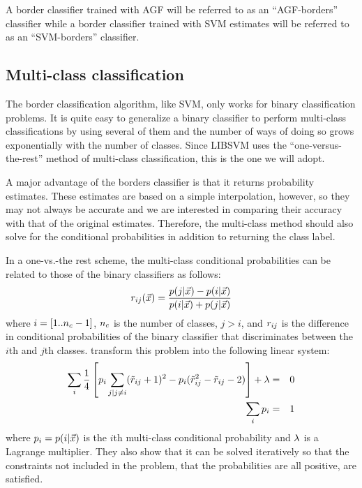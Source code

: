 \documentclass[11pt]{article}
\begin{document}
A border classifier trained with AGF will be referred to as an ``AGF-borders''
classifier while a border classifier trained with SVM estimates will
be referred to as an ``SVM-borders'' classifier.

\subsection{Multi-class classification}

The border classification algorithm, like SVM, only works for binary 
classification problems. It is quite easy to generalize a binary classifier
to perform multi-class classifications by using several of them and the
number of ways of doing so grows exponentially with the number of classes.
Since LIBSVM uses the ``one-versus-the-rest'' method \citep{Hsu_Lin2002} of 
multi-class classification, this is the one we will adopt. 

A major advantage of the
borders classifier is that it returns probability estimates.
These estimates are based on a simple interpolation, however, so they may
not always be accurate and we are interested in comparing their accuracy
with that of the original estimates. Therefore, the multi-class method
should also solve for the conditional probabilities in addition to returning
the class label.

In a one-vs.-the rest scheme, the multi-class conditional probabilities 
can be related to those of the binary classifiers as follows:
\begin{equation}
	r_{ij}(\vec {x}) = \frac{p(j|\vec {x}) - p(i|\vec {x})}{p(i|\vec {x}) + p(j|\vec {x})}
\end{equation}
where $i=[1..n_c-1]$, $n_c$ is the number of classes, $j>i$,
and $r_{ij}$ is the difference in conditional probabilities of
the binary classifier that discriminates between the $i$th and $j$th classes.
\citet{Wu_etal2004} transform this problem into the following linear system:
\begin{eqnarray}
	\sum_i \frac{1}{4} \left [ p_i \sum_{j|j \ne i} (\tilde r_{ij} + 1)^2 - p_i (\tilde r_{ij}^2 - \tilde r_{ij} - 2) \right ] + \lambda & = & 0 \\
	\label{multiclass}
	\sum_i p_i & = & 1
\end{eqnarray}
where $p_i = p(i | \vec {x})$ is the $i$th multi-class 
conditional probability and $\lambda$ is a Lagrange multiplier.
They also show that it can be solved iteratively so that the constraints 
not included in the problem, that the probabilities are all positive, are satisfied.
\end{document}

